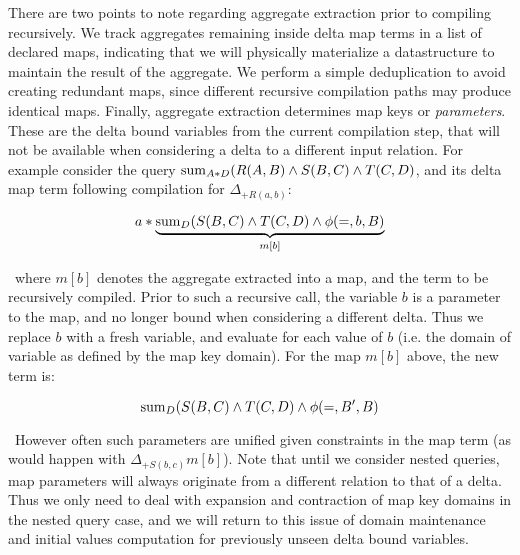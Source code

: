There are two points to note regarding aggregate extraction prior to compiling
recursively. We track aggregates remaining inside delta map terms in a list of
declared maps, indicating that we will physically materialize a datastructure to
maintain the result of the aggregate. We perform a simple deduplication to avoid
creating redundant maps, since different recursive compilation paths may produce
identical maps. Finally, aggregate extraction determines map keys or
\textit{parameters}. These are the delta bound variables from the current
compilation step, that will not be available when considering a delta to a
different input relation. For example consider the query
$\mathrm{sum}_{A*D}(R(A,B) \wedge S(B,C) \wedge T(C,D)$, and its delta map term
following compilation for $\Delta_{+R(a,b)}$:

\[a*\underbrace{\mathrm{sum}_{D}(S(B,C) \wedge T(C,D) \wedge \phi(=,b,B)}_{m[b]}\]

\noindent~where $m[b]$ denotes the aggregate extracted into a map, and the term
to be recursively compiled. Prior to such a recursive call, the variable $b$ is
a parameter to the map, and no longer bound when considering a different
delta. Thus we replace $b$ with a fresh variable, and evaluate for each value of
$b$ (i.e. the domain of variable as defined by the map key domain). For the map
$m[b]$ above, the new term is:

\[\mathrm{sum}_{D}(S(B,C) \wedge T(C,D) \wedge \phi(=,B',B)\]

\noindent~However often such parameters are unified given constraints in the map
term (as would happen with $\Delta_{+S(b,c)} m[b]$). Note that until we consider
nested queries, map parameters will always originate from a different
relation to that of a delta. Thus we only need to deal with expansion and
contraction of map key domains in the nested query case, and we will return to
this issue of domain maintenance and initial values computation for previously
unseen delta bound variables.

